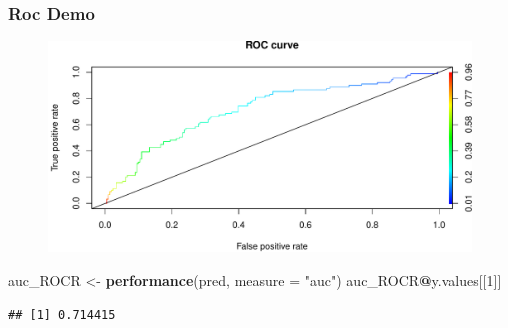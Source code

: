 \documentclass[
  shownotes,
  xcolor={svgnames},
  hyperref={colorlinks,citecolor=DarkBlue,linkcolor=DarkRed,urlcolor=DarkBlue}
  , aspectratio=169]{beamer}
\newenvironment{Shaded}{\begin{snugshade}}{\end{snugshade}}
\newcommand{\DataTypeTok}[1]{\textcolor[rgb]{0.13,0.29,0.53}{#1}}
\newcommand{\DecValTok}[1]{\textcolor[rgb]{0.00,0.00,0.81}{#1}}
\newcommand{\KeywordTok}[1]{\textcolor[rgb]{0.13,0.29,0.53}{\textbf{#1}}}
\newcommand{\NormalTok}[1]{#1}
\newcommand{\OperatorTok}[1]{\textcolor[rgb]{0.81,0.36,0.00}{\textbf{#1}}}
\newcommand{\StringTok}[1]{\textcolor[rgb]{0.31,0.60,0.02}{#1}}
\begin{document}
\begin{frame}[fragile]
\frametitle{Roc Demo}


 \begin{figure}[H] \centering
            \captionsetup{justification=centering}
              \includegraphics[scale=0.4]{figures/unnamed-chunk-7-1.pdf}
 \end{figure}

\begin{scriptsize}
\begin{Shaded}
\begin{Highlighting}[]
\NormalTok{auc\_ROCR \textless{}{-}}\StringTok{ }\KeywordTok{performance}\NormalTok{(pred, }\DataTypeTok{measure =} \StringTok{"auc"}\NormalTok{)}
\NormalTok{auc\_ROCR}\OperatorTok{@}\NormalTok{y.values[[}\DecValTok{1}\NormalTok{]]}
\end{Highlighting}
\end{Shaded}

\begin{verbatim}
## [1] 0.714415
\end{verbatim}
\end{scriptsize}

\end{frame}
\end{document}
